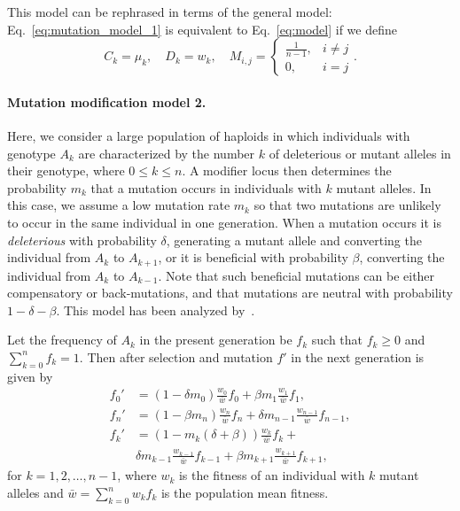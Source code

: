 \documentclass[9pt, a4paper, twocolumn]{extarticle}
\begin{document}
This model can be rephrased in terms of the general model: 
Eq.~\ref{eq:mutation_model_1} is equivalent to Eq.~\ref{eq:model} if we define
\begin{equation} 
C_k = \mu_k, \quad
D_k = w_k, \quad
M_{i,j} = \begin{cases}
\frac{1}{n-1}, & i \ne j \\
0, & i=j
\end{cases}.
\end{equation}

\paragraph*{Mutation modification model 2.}\label{sec:mut_model_2}

Here, we consider a large population of haploids in which individuals with genotype $A_k$ are characterized by the number $k$ of deleterious or mutant alleles in their genotype, where $0 \le k \le n$.
A modifier locus then determines the probability $m_k$ that a mutation occurs in individuals with $k$ mutant alleles.
In this case, we assume a low mutation rate $m_k$ so that two mutations are unlikely to occur in the same individual in one generation.
When a mutation occurs it is \emph{deleterious} with probability $\delta$, generating a mutant allele and converting the individual from $A_k$ to $A_{k+1}$, or it is beneficial with probability $\beta$, converting the individual from $A_k$ to $A_{k-1}$.
Note that such beneficial mutations can be either compensatory or back-mutations, and that mutations are neutral with probability $1-\delta-\beta$.
This model has been analyzed by~\citet{Ram2012}.

Let the frequency of $A_k$ in the present generation be $f_k$ such that $f_k \ge 0$ and $\sum_{k=0}^{n}{f_k}=1$.
Then after selection and mutation $f'$ in the next generation is given by
\begin{equation}
\begin{aligned}
f_0' &= (1 - \delta m_0) \frac{w_0}{\bar{w}} f_0 + \beta m_{1} \frac{w_{1}}{\bar{w}} f_{1}, \\
f_n' &= (1 - \beta m_n) \frac{w_n}{\bar{w}} f_n + \delta m_{n-1} \frac{w_{n-1}}{\bar{w}} f_{n-1}, \\
f_k' &= (1 - m_k(\delta+\beta)) \frac{w_k}{\bar{w}} f_k + \\
	 & \delta m_{k-1} \frac{w_{k-1}}{\bar{w}} f_{k-1} + 
	 \beta m_{k+1} \frac{w_{k+1}}{\bar{w}} f_{k+1},
\end{aligned}
\label{eq:mutation_model_2}
\end{equation}
for $k=1,2,\ldots, n-1$, where $w_k$ is the fitness of an individual with $k$ mutant alleles and $\bar{w} = \sum_{k=0}^{n}{w_k f_k}$ is the population mean fitness.
\end{document}

